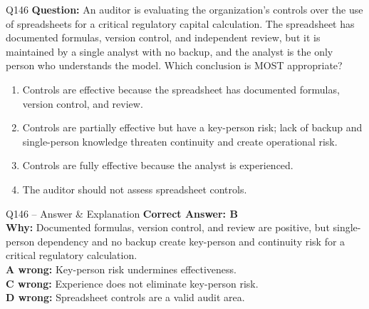 \documentclass[aspectratio=169,10pt]{beamer}
\begin{document}
	\begin{frame}[t]{Q146}
		\small
		\textbf{Question:} An auditor is evaluating the organization's controls over the use of spreadsheets for a critical regulatory capital calculation. The spreadsheet has documented formulas, version control, and independent review, but it is maintained by a single analyst with no backup, and the analyst is the only person who understands the model. Which conclusion is MOST appropriate?
		\begin{enumerate}[label=\Alph*.,itemsep=1pt,topsep=2pt]
			\item Controls are effective because the spreadsheet has documented formulas, version control, and review.
			\item Controls are partially effective but have a key-person risk; lack of backup and single-person knowledge threaten continuity and create operational risk.
			\item Controls are fully effective because the analyst is experienced.
			\item The auditor should not assess spreadsheet controls.
		\end{enumerate}
	\end{frame}
	
	\begin{frame}[t]{Q146 -- Answer \& Explanation}
		\small
		\textbf{Correct Answer: B} \\[4pt]
		\textbf{Why:} Documented formulas, version control, and review are positive, but single-person dependency and no backup create key-person and continuity risk for a critical regulatory calculation. \\[4pt]
		\textbf{A wrong:} Key-person risk undermines effectiveness. \\[2pt]
		\textbf{C wrong:} Experience does not eliminate key-person risk. \\[2pt]
		\textbf{D wrong:} Spreadsheet controls are a valid audit area.
	\end{frame}
	
\end{document}
